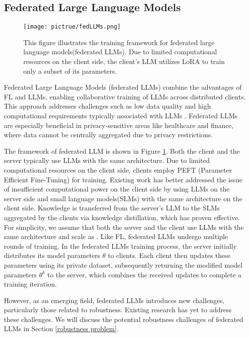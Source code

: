 \subsection{Federated Large Language Models}
\begin{figure}[htbp]  %
    \centering
    \texttt{[image: pictrue/fedLLMs.png]}  %
    \caption{This figure illustrates the training framework for federated large language models(federated LLMs). Due to limited computational resources on the client side, the client's LLM utilizes LoRA to train only a subset of its parameters.}  %
    \label{fig:example}  %
\end{figure}


Federated Large Language Models (federated LLMs) combine the advantages of FL and LLMs, enabling collaborative training of LLMs across distributed clients. This approach addresses challenges such as low data quality and high computational requirements typically associated with LLMs \cite{sani2024futurelargelanguagemodel}. Federated LLMs are especially beneficial in privacy-sensitive areas like healthcare and finance, where data cannot be centrally aggregated due to privacy restrictions.

The framework of federated LLM is shown in Figure \ref{fig:example}. Both the client and the server typically use LLMs with the same architecture. Due to limited computational resources on the client side, clients employ PEFT (Parameter Efficient Fine-Tuning) for training. Existing work \cite{fan2024fedcollm,fan2024fedmkt} has better addressed the issue of insufficient computational power on the client side by using LLMs on the server side and small language models(SLMs) with the same architecture on the client side. Knowledge is transferred from the server's LLM to the SLMs aggregated by the clients via knowledge distillation, which has proven effective. For simplicity, we assume that both the server and the client use LLMs with the same architecture and scale as \cite{10.1007/978-981-97-5569-1_17}. Like FL, federated LLMs undergo multiple rounds of training. In the federated LLMs training process, the server initially distributes its model parameters $\theta$ to clients. Each client then updates these parameters using its private dataset, subsequently returning the modified model parameters $\theta^k$ to the server, which combines the received updates to complete a training iteration.

However, as an emerging field, federated LLMs introduces new challenges, particularly those related to robustness. Existing research has yet to address these challenges. We will discuss the potential robustness challenges of federated LLMs in Section \ref{robustness problem}.



